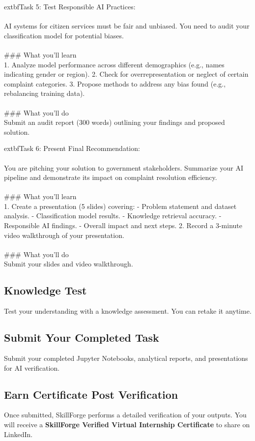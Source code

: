\documentclass{article}
\begin{document}
	extbf{Task 5:} Test Responsible AI Practices:  \\
 \\
 AI systems for citizen services must be fair and unbiased. You need to audit your classification model for potential biases. \\
 \\
### What you'll learn \\
1. Analyze model performance across different demographics (e.g., names indicating gender or region). 2. Check for overrepresentation or neglect of certain complaint categories. 3. Propose methods to address any bias found (e.g., rebalancing training data). \\
 \\
### What you'll do \\
Submit an audit report (300 words) outlining your findings and proposed solution.

	extbf{Task 6:} Present Final Recommendation:  \\
 \\
 You are pitching your solution to government stakeholders. Summarize your AI pipeline and demonstrate its impact on complaint resolution efficiency. \\
 \\
### What you'll learn \\
1. Create a presentation (5 slides) covering: - Problem statement and dataset analysis. - Classification model results. - Knowledge retrieval accuracy. - Responsible AI findings. - Overall impact and next steps. 2. Record a 3-minute video walkthrough of your presentation. \\
 \\
### What you'll do \\
Submit your slides and video walkthrough.

\subsection*{Knowledge Test}
Test your understanding with a knowledge assessment. You can retake it anytime.\\

\subsection*{Submit Your Completed Task}
Submit your completed Jupyter Notebooks, analytical reports, and presentations for AI verification.\\

\subsection*{Earn Certificate Post Verification}
Once submitted, SkillForge performs a detailed verification of your outputs. You will receive a \textbf{SkillForge Verified Virtual Internship Certificate} to share on LinkedIn.\\

\newpage
\end{document}
